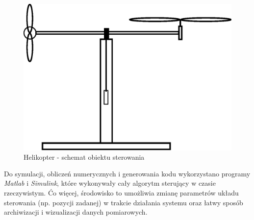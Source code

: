 \documentclass[11pt,a4paper]{article}
\begin{document}
\begin{figure}[h!]
	\centering
	\includegraphics[scale = 0.4]{Figures/model_helikoptera.eps}
	\caption		
	{Helikopter - schemat obiektu sterowania}
	\label{heli_model}
\end{figure} 
Do symulacji, obliczeń numerycznych i generowania kodu wykorzystano programy \textit{Matlab} i \textit{Simulink}, które wykonywały cały algorytm sterujący w czasie rzeczywistym. \'Co więcej, środowisko to umożliwia zmianę parametrów układu sterowania (np. pozycji zadanej) w trakcie działania systemu oraz łatwy sposób archiwizacji i wizualizacji danych pomiarowych.

\FloatBarrier
\end{document}
